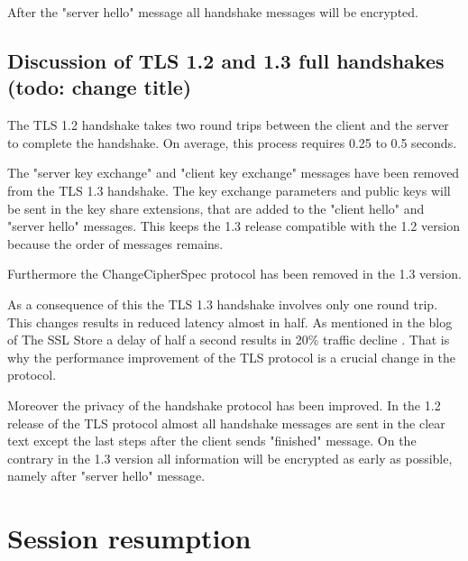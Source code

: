 After the "server hello" message all handshake messages will be encrypted.
\cite{recorla}
\subsection{Discussion of TLS 1.2 and 1.3 full handshakes (todo: change title)}
\label{subsec:comparison_handshake}

The TLS 1.2 handshake takes two round trips between the client and the server to complete the handshake. On average, this process requires 0.25 to 0.5 seconds.

The "server key exchange" and "client key exchange" messages have been removed from the TLS 1.3 handshake. The key exchange parameters and public keys will be sent in the key share extensions, that are added to the "client hello" and "server hello" messages. This keeps the 1.3 release compatible with the 1.2 version because the order of messages remains.

Furthermore the ChangeCipherSpec protocol has been removed in the 1.3 version. 

As a consequence of this the TLS 1.3 handshake involves only one round trip. This changes results in reduced latency almost in half. As mentioned in the blog of The SSL Store a delay of half a second results in 20\% traffic decline \cite{sslstore:handshake}. That is why the performance improvement of the TLS protocol is a crucial change in the protocol.

Moreover the privacy of the handshake protocol has been improved. In the 1.2 release of the TLS protocol almost all handshake messages are sent in the clear text except the last steps after the client sends "finished" message. On the contrary in the 1.3 version all information will be encrypted as early as possible, namely after "server hello" message. 

\section{Session resumption}
\label{sec:comparison_resumption}

